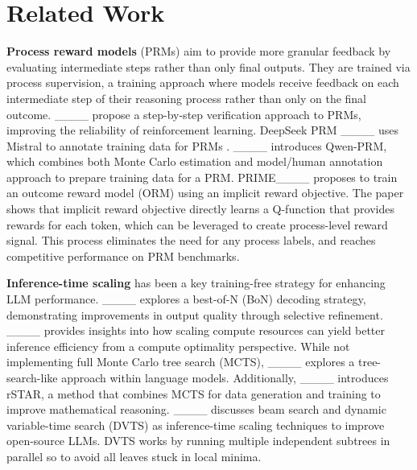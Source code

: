 \section{Related Work}
\textbf{Process reward models} (PRMs) aim to provide more granular feedback by evaluating intermediate steps rather than only final outputs.
They are trained via process supervision, a training approach where models receive feedback on each intermediate step of their reasoning process rather than only on the final outcome.
____ propose a step-by-step verification approach to PRMs, improving the reliability of reinforcement learning.
DeepSeek PRM ____ uses Mistral to annotate training data for PRMs .
____ introduces Qwen-PRM, which combines both Monte Carlo estimation and model/human annotation approach to prepare training data for a PRM. %
PRIME____ proposes to train an outcome reward model (ORM) using an implicit reward objective. The paper shows that implicit reward objective directly learns a Q-function that provides rewards for each token, which can be leveraged to create process-level reward signal. This process eliminates the need for any process labels, and reaches competitive performance on PRM benchmarks. 




\textbf{Inference-time scaling} has been a key training-free strategy for enhancing LLM performance. ____ explores a best-of-N (BoN) decoding strategy, demonstrating improvements in output quality through selective refinement. ____ provides insights into how scaling compute resources can yield better inference efficiency from a compute optimality perspective.
While not implementing full Monte Carlo tree search (MCTS), ____ explores a tree-search-like approach within language models. 
Additionally, ____ introduces rSTAR, a method that combines MCTS for data generation and training to improve mathematical reasoning. ____ discusses beam search and dynamic variable-time search (DVTS) as inference-time scaling techniques to improve open-source LLMs. DVTS works by running multiple independent subtrees in parallel so to avoid all leaves stuck in local minima.

